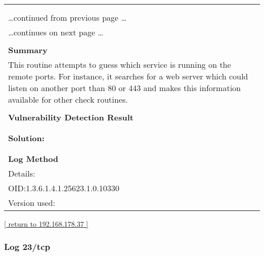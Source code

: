 \documentclass{article}
\begin{document}
\begin{longtable}{|p{}|}
\hline
\rowcolor{gvm_log}{\color{white}{Log (CVSS: 0.0) }}\\
\rowcolor{gvm_log}{\color{white}{NVT: Services}}\\
\hline
\endfirsthead
\hfill\ldots continued from previous page \ldots \\
\hline
\endhead
\hline
\ldots continues on next page \ldots \\
\endfoot
\hline
\endlastfoot
\\
\textbf{Summary}\\
This routine attempts to guess which service is running on the
  remote ports. For instance, it searches for a web server which could listen on another port than
  80 or 443 and makes this information available for other check routines.\\

        \hline
        \\
\textbf{Vulnerability Detection Result}\\
\rowcolor{white}{\verb=A web server is running on this port=}\\

          \hline
          \\
\textbf{Solution:}\\
\\


        \hline
        \\
\textbf{Log Method}\\
Details:
\rowcolor{white}{\verb=Services=}\\
OID:1.3.6.1.4.1.25623.1.0.10330\\
Version used:
\rowcolor{white}{\verb=2021-03-15T10:42:03Z=}\\
\end{longtable}

\begin{footnotesize}\hyperref[host:192.168.178.37]{[ return to 192.168.178.37 ]}\end{footnotesize}
\subsubsection{Log 23/tcp}
\label{port:192.168.178.37 23/tcp Log}
\end{document}
